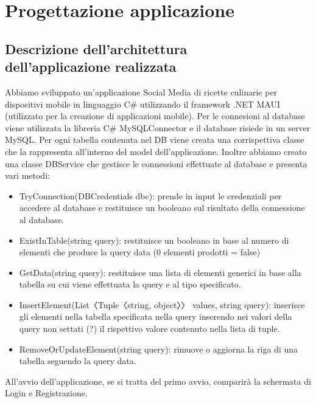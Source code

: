 ﻿\documentclass[a4paper,12pt]{report}
\begin{document}
\chapter{Progettazione applicazione}
\section{Descrizione dell'architettura\\ dell'applicazione realizzata}
Abbiamo sviluppato un'applicazione Social Media di ricette culinarie per dispositivi mobile in linguaggio C\# utilizzando il framework .NET MAUI (utilizzato per la creazione di applicazioni mobile).
Per le connesioni al database viene utilizzata la libreria C\# MySQLConnector e il database risiede in un server MySQL.
Per ogni tabella contenuta nel DB viene creata una corrispettiva classe che la rappresenta all'interno del
model dell'applicazione. Inoltre abbiamo creato una classe DBService che gestisce le connessioni effettuate al database e presenta vari metodi:
\begin{itemize}
    \item TryConnection(DBCredentials dbc): prende in input le credenziali per accedere al database e restituisce un booleano sul risultato della connessione al database.
    \item ExistInTable(string query): restituisce un booleano in base al numero di elementi che produce la query data (0 elementi prodotti = false)
    \item GetData(string query): restituisce una lista di elementi generici in base alla tabella su cui viene effettuata la query e al tipo specificato.
    \item InsertElement(List〈Tuple〈string, object〉〉 values, string query): inserisce gli elementi nella tabella specificata nella query inserendo nei valori della query non settati (?) il rispettivo valore contenuto nella lista di tuple.
    \item RemoveOrUpdateElement(string query): rimuove o aggiorna la riga di una tabella seguendo la query data.
\end{itemize}
All'avvio dell'applicazione, se si tratta del primo avvio, comparirà la schermata di Login e Registrazione.
\end{document}
